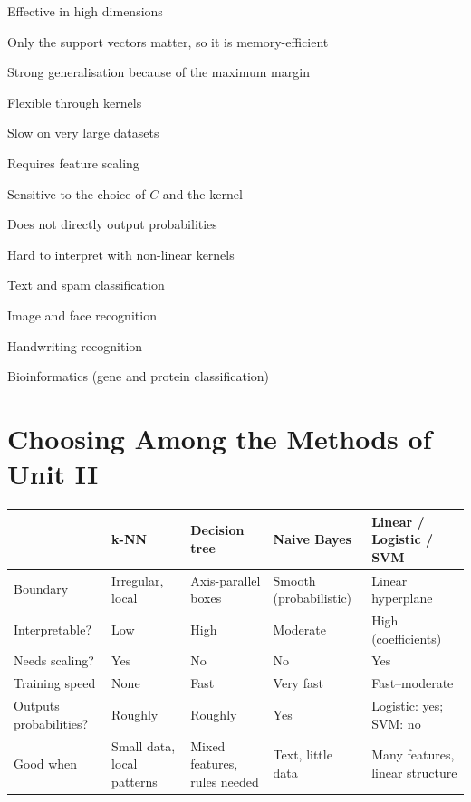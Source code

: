 {\item Effective in high dimensions
 \item Only the support vectors matter, so it is memory-efficient
 \item Strong generalisation because of the maximum margin
 \item Flexible through kernels}
{\item Slow on very large datasets
 \item Requires feature scaling
 \item Sensitive to the choice of $C$ and the kernel
 \item Does not directly output probabilities
 \item Hard to interpret with non-linear kernels}
{\item Text and spam classification
 \item Image and face recognition
 \item Handwriting recognition
 \item Bioinformatics (gene and protein classification)}

\section{Choosing Among the Methods of Unit II}

\begin{center}
\small
\begin{tabular}{@{}p{2.7cm}p{2.6cm}p{2.8cm}p{2.7cm}p{2.7cm}@{}}
\toprule
 & \textbf{k-NN} & \textbf{Decision tree} & \textbf{Naive Bayes} & \textbf{Linear / Logistic / SVM}\\
\midrule
Boundary & Irregular, local & Axis-parallel boxes & Smooth (probabilistic) & Linear hyperplane\\
Interpretable? & Low & High & Moderate & High (coefficients)\\
Needs scaling? & Yes & No & No & Yes\\
Training speed & None & Fast & Very fast & Fast--moderate\\
Outputs probabilities? & Roughly & Roughly & Yes & Logistic: yes; SVM: no\\
Good when & Small data, local patterns & Mixed features, rules needed & Text, little data & Many features, linear structure\\
\bottomrule
\end{tabular}
\end{center}

